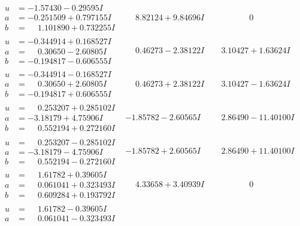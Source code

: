 \documentclass[1p]{elsarticle_modified}
\theoremstyle{definition}
\begin{document}
$$\begin{array}{c|c|c}
 \hline 
\begin{aligned}
u &= -1.57430 - 0.29595 I \\
a &= -0.251509 + 0.797155 I \\
b &= \phantom{-}1.101890 + 0.732255 I\end{aligned}
 & \phantom{-}8.82124 + 9.84696 I & \phantom{-0.000000 } 0 \\ \hline\begin{aligned}
u &= -0.344914 + 0.168527 I \\
a &= \phantom{-}0.30650 - 2.60805 I \\
b &= -0.194817 - 0.606555 I\end{aligned}
 & \phantom{-}0.46273 - 2.38122 I & \phantom{-}3.10427 + 1.63624 I \\ \hline\begin{aligned}
u &= -0.344914 - 0.168527 I \\
a &= \phantom{-}0.30650 + 2.60805 I \\
b &= -0.194817 + 0.606555 I\end{aligned}
 & \phantom{-}0.46273 + 2.38122 I & \phantom{-}3.10427 - 1.63624 I \\ \hline\begin{aligned}
u &= \phantom{-}0.253207 + 0.285102 I \\
a &= -3.18179 + 4.75906 I \\
b &= \phantom{-}0.552194 + 0.272160 I\end{aligned}
 & -1.85782 - 2.60565 I & \phantom{-}2.86490 - 11.40100 I \\ \hline\begin{aligned}
u &= \phantom{-}0.253207 - 0.285102 I \\
a &= -3.18179 - 4.75906 I \\
b &= \phantom{-}0.552194 - 0.272160 I\end{aligned}
 & -1.85782 + 2.60565 I & \phantom{-}2.86490 + 11.40100 I \\ \hline\begin{aligned}
u &= \phantom{-}1.61782 + 0.39605 I \\
a &= \phantom{-}0.061041 + 0.323493 I \\
b &= \phantom{-}0.609284 + 0.193792 I\end{aligned}
 & \phantom{-}4.33658 + 3.40939 I & \phantom{-0.000000 } 0 \\ \hline\begin{aligned}
u &= \phantom{-}1.61782 - 0.39605 I \\
a &= \phantom{-}0.061041 - 0.323493 I \\

\end{aligned}
\end{array}$$
\end{document}
